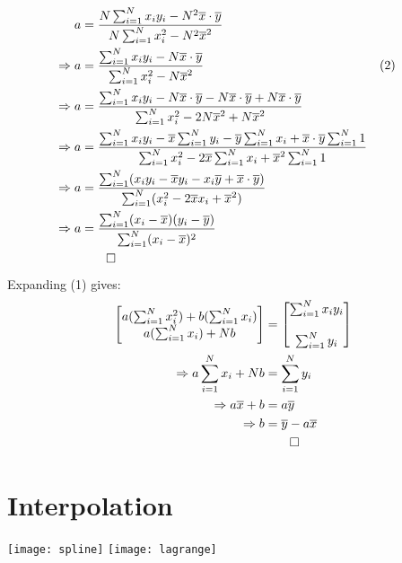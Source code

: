 \documentclass[10pt, twocolumn]{article}
\begin{document}
\begin{align*}
	a &= \frac	{N\sum_{i=1}^{N}x_iy_i	-	N^2\overline{x} \cdot\overline{y}}
				{N\sum_{i=1}^{N}x_i^2 - N^2\overline{x}^2}\\
	\Rightarrow a &= \frac	{\sum_{i=1}^{N}x_iy_i	-	N\overline{x} \cdot\overline{y}} 
						  	{\sum_{i=1}^{N}x_i^2 - N\overline{x}^2}	&&(2)\\
	\Rightarrow a &= \frac{\sum_{i=1}^{N}x_iy_i  - N\overline{x} \cdot\overline{y} - N\overline{x} \cdot\overline{y} + N\overline{x} \cdot\overline{y}} 
	{\sum_{i=1}^{N}x_i^2 - 2N\overline{x}^2 + N\overline{x}^2}\\
	\Rightarrow a &= \frac	{\sum_{i=1}^{N}x_iy_i - \overline{x}\sum_{i=1}^{N}y_i - \overline{y}\sum_{i=1}^{N}x_i + \overline{x}\cdot\overline{y}\sum_{i=1}^{N}1}
							{\sum_{i=1}^{N}x_i^2 - 2\overline{x}\sum_{i=1}^{N}x_i + \overline{x}^2\sum_{i=1}^{N}1}\\
	\Rightarrow a &= \frac	{\sum_{i=1}^{N}(x_iy_i - \overline{x}y_i - x_i\overline{y} + \overline{x}\cdot\overline{y})}
							{\sum_{i=1}^{N}(x_i^2 - 2\overline{x}x_i + \overline{x}^2)}\\
	\Rightarrow a &= \frac	{\sum_{i=1}^{N}(x_i - \overline{x})(y_i - \overline{y})}
							{\sum_{i=1}^{N}(x_i - \overline{x})^2}\\
							&\qed\\	
\end{align*}
Expanding (1) gives:
\begin{align*}
	\begin{bmatrix}
		a(\sum_{i=1}^{N}x_i^2) + b(\sum_{i=1}^{N}x_i)\\
		a(\sum_{i=1}^{N}x_i) + Nb
	\end{bmatrix}
	&=
	\begin{bmatrix}
		\sum_{i=1}^{N}x_iy_i\\\\
		\sum_{i=1}^{N}y_i
	\end{bmatrix}\\
	\Rightarrow 
	a\sum_{i=1}^{N}x_i + Nb &= \sum_{i=1}^{N}y_i\\
	\Rightarrow a\overline{x} + b &= a\overline{y}\\
	\Rightarrow b &= \overline{y} - a\overline{x}\\
	&\qed\\
\end{align*}
\pagebreak
\setcounter{section}{4}
\section{Interpolation}
	\texttt{[image: spline]}
	\texttt{[image: lagrange]}
	
\end{document}
